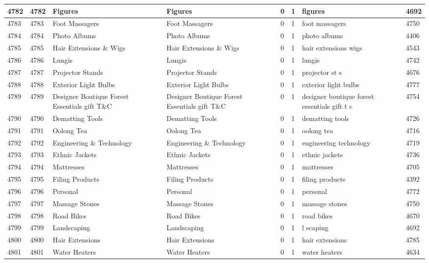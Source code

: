 \begin{longtable}{|l|l|l|l|l|l|l|l|}
4782 & 4782 & Figures & Figures & 0 & 1 & figures & 4692 \\ \hline 
4783 & 4783 & Foot Massagers & Foot Massagers & 0 & 1 & foot massagers & 4750 \\ \hline 
4784 & 4784 & Photo Albums & Photo Albums & 0 & 1 & photo albums & 4406 \\ \hline 
4785 & 4785 & Hair Extensions \& Wigs & Hair Extensions \& Wigs & 0 & 1 & hair extensions wigs & 4543 \\ \hline 
4786 & 4786 & Lungis & Lungis & 0 & 1 & lungis & 4742 \\ \hline 
4787 & 4787 & Projector Stands & Projector Stands & 0 & 1 & projector st s & 4676 \\ \hline 
4788 & 4788 & Exterior Light Bulbs & Exterior Light Bulbs & 0 & 1 & exterior light bulbs & 4777 \\ \hline 
4789 & 4789 & Designer Boutique Forest Essentials gift T\&C & Designer Boutique Forest Essentials gift T\&C & 0 & 1 & designer boutique forest essentials gift t c & 4754 \\ \hline 
4790 & 4790 & Dematting Tools & Dematting Tools & 0 & 1 & dematting tools & 4726 \\ \hline 
4791 & 4791 & Oolong Tea & Oolong Tea & 0 & 1 & oolong tea & 4716 \\ \hline 
4792 & 4792 & Engineering \& Technology & Engineering \& Technology & 0 & 1 & engineering technology & 4719 \\ \hline 
4793 & 4793 & Ethnic Jackets & Ethnic Jackets & 0 & 1 & ethnic jackets & 4736 \\ \hline 
4794 & 4794 & Mattresses & Mattresses & 0 & 1 & mattresses & 4705 \\ \hline 
4795 & 4795 & Filing Products & Filing Products & 0 & 1 & filing products & 4392 \\ \hline 
4796 & 4796 & Personal & Personal & 0 & 1 & personal & 4772 \\ \hline 
4797 & 4797 & Massage Stones & Massage Stones & 0 & 1 & massage stones & 4750 \\ \hline 
4798 & 4798 & Road Bikes & Road Bikes & 0 & 1 & road bikes & 4670 \\ \hline 
4799 & 4799 & Landscaping & Landscaping & 0 & 1 & l scaping & 4692 \\ \hline 
4800 & 4800 & Hair Extensions & Hair Extensions & 0 & 1 & hair extensions & 4785 \\ \hline 
4801 & 4801 & Water Heaters & Water Heaters & 0 & 1 & water heaters & 4634 \\ \hline 

\end{longtable}
